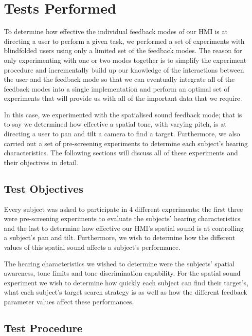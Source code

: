 \documentclass[format=sigconf, review=true, screen=true, anonymous=true]{acmart}
\begin{document}
\section{Tests Performed}

To determine how effective the individual feedback modes of our HMI is at directing a user to perform a given task, we performed a set of experiments with blindfolded users using only a limited set of the feedback modes. The reason for only experimenting with one or two modes together is to simplify the experiment procedure and incrementally build up our knowledge of the interactions between the user and the feedback mode so that we can eventually integrate all of the feedback modes into a single implementation and perform an optimal set of experiments that will provide us with all of the important data that we require. 

In this case, we experimented with the spatialised sound feedback mode; that is to say we determined how effective a spatial tone, with varying pitch, is at directing a user to pan and tilt a camera to find a target. Furthermore, we also carried out a set of pre-screening experiments to determine each subject's hearing characteristics. The following sections will discuss all of these experiments and their objectives in detail. 

\subsection{Test Objectives}

Every subject was asked to participate in 4 different experiments: the first three were pre-screening experiments to evaluate the subjects' hearing characteristics and the last to determine how effective our HMI's spatial sound is at controlling a subject's pan and tilt. Furthermore, we wish to determine how the different values of this spatial sound affects a subject's performance. 

The hearing characteristics we wished to determine were the subjects' spatial awareness, tone limits and tone discrimination capability. For the spatial sound experiment we wish to determine how quickly each subject can find their target's, what each subject's target search strategy is as well as how the different feedback parameter values affect these performances. 

\subsection{Test Procedure}
\end{document}
